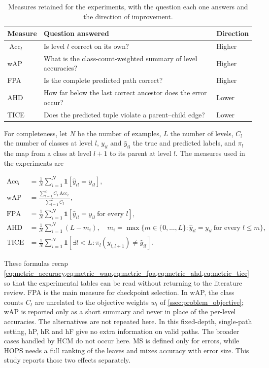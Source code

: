 \begin{table}[ht]
\centering
\caption{Measures retained for the experiments, with the question each one
answers and the direction of improvement.}
\label{tab:metrics_summary}
\experimenttablesetup
\begin{tabularx}{\linewidth}{@{}L{2.3cm}Y L{1.8cm}@{}}
\toprule
\textbf{Measure} & \textbf{Question answered} & \textbf{Direction} \\
\midrule
$\operatorname{Acc}_l$ & Is level $l$ correct on its own? & Higher \\
wAP & What is the class-count-weighted summary of level accuracies? & Higher \\
FPA & Is the complete predicted path correct? & Higher \\
AHD & How far below the last correct ancestor does the error occur? & Lower \\
TICE & Does the predicted tuple violate a parent--child edge? & Lower \\
\bottomrule
\end{tabularx}
\end{table}

For completeness, let $N$ be the number of examples, $L$ the number of levels,
$C_l$ the number of classes at level $l$, $y_{il}$ and $\hat y_{il}$ the true
and predicted labels, and $\pi_l$ the map from a class at level $l+1$ to its
parent at level $l$. The measures used in the experiments are

\begin{align*}
\operatorname{Acc}_l
&=\frac{1}{N}\sum_{i=1}^{N}\mathbf{1}[\hat y_{il}=y_{il}], \\
\mathrm{wAP}
&=\frac{\sum_{l=1}^{L}C_l\operatorname{Acc}_l}{\sum_{l=1}^{L}C_l}, \\
\mathrm{FPA}
&=\frac{1}{N}\sum_{i=1}^{N}
  \mathbf{1}[\hat y_{il}=y_{il}\ \text{for every }l], \\
\mathrm{AHD}
&=\frac{1}{N}\sum_{i=1}^{N}(L-m_i),
\quad
m_i=\max\bigl\{m\in\{0,\dots,L\}:\hat y_{il}=y_{il}
\ \text{for every }l\leq m\bigr\}, \\
\mathrm{TICE}
&=\frac{1}{N}\sum_{i=1}^{N}
  \mathbf{1}[\exists l<L:\pi_l(\hat y_{i,l+1})\neq\hat y_{il}].
\end{align*}

These formulas recap
\cref{eq:metric_accuracy,eq:metric_wap,eq:metric_fpa,eq:metric_ahd,eq:metric_tice}
so that the experimental tables can be read without returning to the literature
review. FPA is the main measure for checkpoint selection. In wAP, the class counts
$C_l$ are unrelated to the objective weights $w_l$ of
\cref{ssec:problem_objective}; wAP is reported only as a short summary and
never in place of the per-level accuracies. The alternatives are not repeated
here. In this fixed-depth, single-path setting, hP, hR and hF give no extra
information on valid paths. The broader cases handled by HCM do not occur here.
MS is defined only for errors, while HOPS needs a full ranking of the leaves and
mixes accuracy with error size. This study reports those two effects separately.

